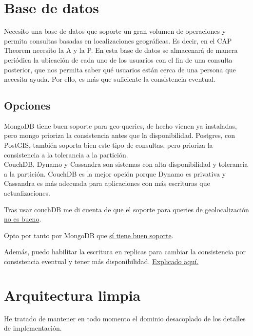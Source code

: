 \section{Base de datos}

Necesito una base de datos que soporte un gran volumen de operaciones y permita consultas basadas en localizaciones geográficas. Es decir, en el CAP Theorem necesito la A y la P.
En esta base de datos se almacenará de manera periódica la ubicación de cada uno de los usuarios con el fin de una consulta posterior, que nos permita saber qué usuarios
están cerca de una persona que necesita ayuda. Por ello, es más que suficiente la consistencia eventual.

\subsection{Opciones}

MongoDB tiene buen soporte para geo-queries, de hecho vienen ya instaladas, pero mongo prioriza la consistencia antes que la disponibilidad. Postgres, con PostGIS, también soporta bien
este tipo de consultas, pero prioriza la consistencia a la tolerancia a la partición. \\
CouchDB, Dynamo y Cassandra son sistemas con alta disponibilidad y tolerancia a la partición. CouchDB es la mejor opción porque Dynamo es privativa y Cassandra es más adecuada para aplicaciones con más
escrituras que actualizaciones. 

Tras usar couchDB me di cuenta de que el soporte para queries de geolocalización \href{https://docs.couchdb.org/en/stable/ddocs/search.html?highlight=geospatial#geographical-searches}{no es bueno}.

Opto por tanto por MongoDB que \href{https://stackoverflow.com/questions/25734092/query-locations-within-a-radius-in-mongodb}{sí tiene buen soporte}.

Además, puedo habilitar la escritura en replicas para cambiar la consistencia por consistencia eventual y tener más disponibilidad. \href{https://stackoverflow.com/questions/11292215/where-does-mongodb-stand-in-the-cap-theorem}{Explicado aquí.}

\section{Arquitectura limpia}

He tratado de mantener en todo momento el dominio desacoplado de los detalles de implementación.

